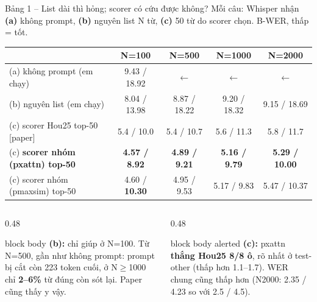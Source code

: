 \documentclass[aspectratio=169,xcolor=table]{beamer}
\newcommand{\bad}[1]{\textcolor{RiskRed}{\textbf{#1}}}
\newcommand{\good}[1]{\textcolor{GoodGreen}{\textbf{#1}}}
\newcommand{\src}[1]{{\tiny\color{TextGray}[#1]}}
\begin{document}
\begin{frame}{Bảng 1 -- List dài thì hỏng; scorer có cứu được không?}
{\small Mỗi câu: Whisper nhận \textbf{(a)} không prompt, \textbf{(b)} nguyên list N từ, \textbf{(c)} 50 từ do scorer chọn. B-WER, thấp = tốt.}\par\vspace{0.15cm}
\centering\footnotesize\setlength{\tabcolsep}{3pt}
\begin{tabular}{lcccc}
\toprule
 & N=100 & N=500 & N=1000 & N=2000\\
\midrule
(a) không prompt (em chạy) & 9.43 / 18.92 & $\leftarrow$ & $\leftarrow$ & $\leftarrow$\\
(b) nguyên list (em chạy) & 8.04 / 13.98 & 8.87 / 18.22 & 9.20 / 18.32 & 9.15 / 18.69\\
\midrule
(c) scorer Hou25 top-50 \src{paper} & 5.4 / 10.0 & 5.4 / 10.7 & 5.6 / 11.3 & 5.8 / 11.7\\
(c) \textbf{scorer nhóm (pxattn) top-50} & \good{4.57 / 8.92} & \good{4.89 / 9.21} & \good{5.16 / 9.79} & \good{5.29 / 10.00}\\
(c) scorer nhóm (pmaxsim) top-50 & 4.60 / \bad{10.30} & 4.95 / 9.53 & 5.17 / 9.83 & 5.47 / 10.37\\
\bottomrule
\end{tabular}
\raggedright\vspace{0.2cm}
\begin{columns}[T]
\begin{column}{0.48\textwidth}
\begin{beamercolorbox}[sep=0.45em,rounded=true]{block body}
\footnotesize\textbf{(b):} chỉ giúp ở N=100. Từ N=500, gần như không prompt: prompt bị cắt còn 223 token cuối, ở N$\geq$1000 chỉ \bad{2--6\%} từ đúng còn sót lại. Paper cũng thấy y vậy.
\end{beamercolorbox}
\end{column}
\begin{column}{0.48\textwidth}
\begin{beamercolorbox}[sep=0.45em,rounded=true]{block body alerted}
\footnotesize\textbf{(c):} pxattn \textbf{thắng Hou25 8/8 ô}, rõ nhất ở test-other (thấp hơn 1.1--1.7). WER chung cũng thấp hơn (N2000: 2.35 / 4.23 so với 2.5 / 4.5).
\end{beamercolorbox}
\end{column}
\end{columns}
\end{frame}
\end{document}
